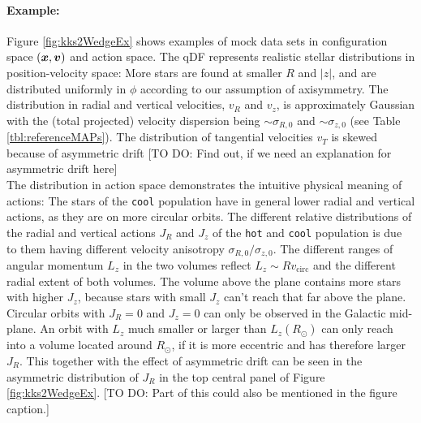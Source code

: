 \paragraph{Example:} Figure \ref{fig:kks2WedgeEx} shows examples of mock data sets in configuration space $(\boldsymbol{x},\boldsymbol{v})$ and action space.  The qDF represents realistic stellar distributions in position-velocity space: More stars are found at smaller $R$ and $|z|$, and are distributed uniformly in $\phi$ according to our assumption of axisymmetry. The distribution in radial and vertical velocities, $v_R$ and $v_z$, is approximately Gaussian with the (total projected) velocity dispersion being $\sim\sigma_{R,0}$ and $\sim\sigma_{z,0}$ (see Table \ref{tbl:referenceMAPs}). The distribution of tangential velocities $v_T$ is skewed because of asymmetric drift [TO DO: Find out, if we need an explanation for asymmetric drift here]
\\The distribution in action space demonstrates the intuitive physical meaning of actions: The stars of the \texttt{cool} population have in general lower radial and vertical actions, as they are on more circular orbits. The different relative distributions of the radial and vertical actions $J_R$ and $J_z$ of the \texttt{hot} and \texttt{cool} population is due to them having different velocity anisotropy $\sigma_{R,0}/\sigma_{z,0}$. The different ranges of angular momentum $L_z$ in the two volumes reflect $L_z \sim R  v_\text{circ}$ and the different radial extent of both volumes. The volume above the plane contains more stars with higher $J_z$, because stars with small $J_z$ can't reach that far above the plane. Circular orbits with $J_R = 0$ and $J_z = 0$ can only be observed in the Galactic mid-plane. An orbit with $L_z$ much smaller or larger than $L_z(R_\odot)$ can only reach into a volume located around $R_\odot$, if it is more eccentric and has therefore larger $J_R$. This together with the effect of asymmetric drift can be seen in the asymmetric distribution of $J_R$ in the top central panel of Figure \ref{fig:kks2WedgeEx}. [TO DO: Part of this could also be mentioned in the figure caption.]





